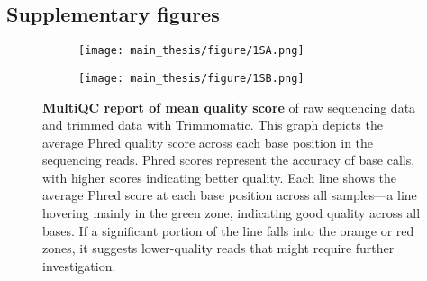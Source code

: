 \documentclass[10pt,letterpaper]{article}
\newcommand{\beginsupplement}{%
        \setcounter{table}{0}
        \renewcommand{\thetable}{S\arabic{table}}%
        \setcounter{figure}{0}
        \renewcommand{\thefigure}{S\arabic{figure}}%
     }
\begin{document}
\subsection*{Supplementary figures}
\beginsupplement{

\renewcommand\thesubfigure{\Alph{subfigure}} %
\begin{figure}[H]
    \centering
    \begin{subfigure}[t]{0.45\textwidth}
            \caption{}
            \centering
            \label{fig1SA}
            \texttt{[image: main\_thesis/figure/1SA.png]} 
            
    \end{subfigure}
    \begin{subfigure}[t]{0.45\textwidth}
        \centering
        \caption{}
        \texttt{[image: main\_thesis/figure/1SB.png]} 
        \label{fig1SB}
    \end{subfigure}
    
    \caption{\textbf{MultiQC report of mean quality score} of  raw sequencing data and  trimmed data with Trimmomatic. This graph depicts the average Phred quality score across each base position in the sequencing reads. Phred scores represent the accuracy of base calls, with higher scores indicating better quality. Each line shows the average Phred score at each base position across all samples—a line hovering mainly in the green zone, indicating good quality across all bases. If a significant portion of the line falls into the orange or red zones, it suggests lower-quality reads that might require further investigation.}
\end{figure}


}
\newpage
\end{document}
